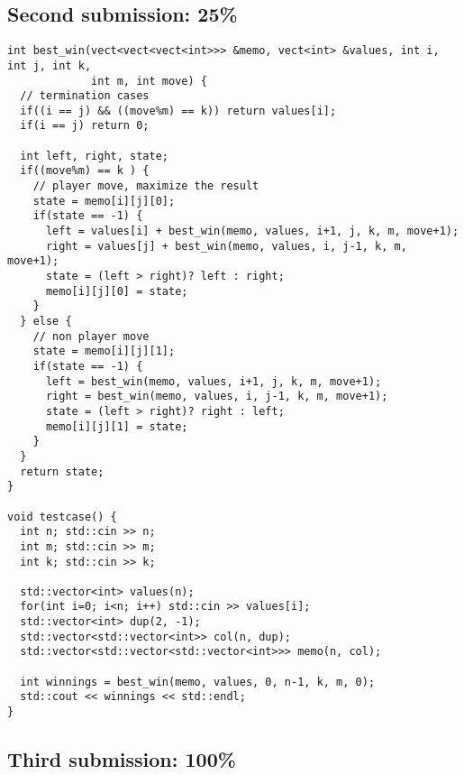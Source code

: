 \documentclass[12pt,letterpaper]{article}
\begin{document}
\subsection*{Second submission: 25\%}
\begin{verbatim}
int best_win(vect<vect<vect<int>>> &memo, vect<int> &values, int i, int j, int k,
             int m, int move) {
  // termination cases
  if((i == j) && ((move%m) == k)) return values[i];
  if(i == j) return 0;
  
  int left, right, state;
  if((move%m) == k ) {
    // player move, maximize the result
    state = memo[i][j][0];
    if(state == -1) {
      left = values[i] + best_win(memo, values, i+1, j, k, m, move+1);
      right = values[j] + best_win(memo, values, i, j-1, k, m, move+1);
      state = (left > right)? left : right;
      memo[i][j][0] = state;
    }
  } else {
    // non player move
    state = memo[i][j][1];
    if(state == -1) {
      left = best_win(memo, values, i+1, j, k, m, move+1);
      right = best_win(memo, values, i, j-1, k, m, move+1);
      state = (left > right)? right : left;
      memo[i][j][1] = state;
    }
  }
  return state;
}

void testcase() {
  int n; std::cin >> n;
  int m; std::cin >> m;
  int k; std::cin >> k;
  
  std::vector<int> values(n);
  for(int i=0; i<n; i++) std::cin >> values[i];
  std::vector<int> dup(2, -1);
  std::vector<std::vector<int>> col(n, dup);
  std::vector<std::vector<std::vector<int>>> memo(n, col);
  
  int winnings = best_win(memo, values, 0, n-1, k, m, 0);
  std::cout << winnings << std::endl;
}
\end{verbatim}

\newpage
\subsection*{Third submission: 100\%}
\end{document}
